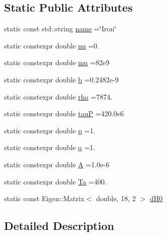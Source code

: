 \subsection*{Static Public Attributes}
\begin{DoxyCompactItemize}
\item 
static const std\+::string \hyperlink{structmodel_1_1_periodic_element_3_0126_00_01_isotropic_01_4_ad9f4b7c53a751ec9949c21c97651cde0}{name} =\char`\"{}Iron\char`\"{}
\item 
static constexpr double \hyperlink{structmodel_1_1_periodic_element_3_0126_00_01_isotropic_01_4_a33a164a02fadd727318a8c079e8374c7}{nu} =0.
\item 
static constexpr double \hyperlink{structmodel_1_1_periodic_element_3_0126_00_01_isotropic_01_4_aedee16b5777c60b48c584b6a1795c17b}{mu} =82e9
\item 
static constexpr double \hyperlink{structmodel_1_1_periodic_element_3_0126_00_01_isotropic_01_4_a00b0025c9e63ebc7b70a17eab0b6866e}{b} =0.\+2482e-\/9
\item 
static constexpr double \hyperlink{structmodel_1_1_periodic_element_3_0126_00_01_isotropic_01_4_a4df1e38356fe48fdf5258c8755fc118b}{rho} =7874.
\item 
static constexpr double \hyperlink{structmodel_1_1_periodic_element_3_0126_00_01_isotropic_01_4_ae8952577b9166dbce37389f3c45f529f}{tau\+P} =420.\+0e6
\item 
static constexpr double \hyperlink{structmodel_1_1_periodic_element_3_0126_00_01_isotropic_01_4_afba3b66bcbb50471a1a5cf9fb6589dcd}{p} =1.
\item 
static constexpr double \hyperlink{structmodel_1_1_periodic_element_3_0126_00_01_isotropic_01_4_aabc8421b3b5d5d09d265a41b7fb1a25e}{q} =1.
\item 
static constexpr double \hyperlink{structmodel_1_1_periodic_element_3_0126_00_01_isotropic_01_4_ad44bc8b4c3234902a51c92648f0d9c8c}{A} =1.\+0e-\/6
\item 
static constexpr double \hyperlink{structmodel_1_1_periodic_element_3_0126_00_01_isotropic_01_4_aae1bee5b5d216f5064f2cfee92b4cb23}{Ta} =400.
\item 
static const Eigen\+::\+Matrix$<$ double, 18, 2 $>$ \hyperlink{structmodel_1_1_periodic_element_3_0126_00_01_isotropic_01_4_a56ae5b1281c97a91195b7656342f31d9}{d\+H0}
\end{DoxyCompactItemize}


\subsection{Detailed Description}
